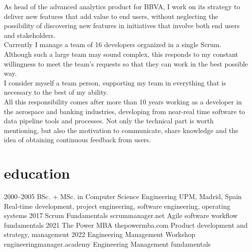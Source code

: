 \documentclass[]{friggeri-cv}
\begin{document}
As {\headingfont head of the advanced analytics product} for BBVA, I work on its strategy to deliver new features that add value to end users, without neglecting the possibility of discovering new features in initiatives that involve both end users and stakeholders. \\
Currently {\headingfont I manage a team of 16 developers} organized in a single Scrum. Although such a large team may sound complex, this responds to my constant willingness to meet the team's requests so that they can work in the best possible way. \\
{\headingfont I consider myself a team person}, supporting my team in everything that is necessary to the best of my ability. \\
{\headingfont All this responsibility comes after more than 10 years working as a developer in the aerospace and banking industries}, developing from near-real time software to data pipeline tools and processes. Not only the technical part is worth mentioning, but also the motivation to communicate, share knowledge and the idea of obtaining continuous feedback from users. \\


\section{education}

\begin{entrylist}
\entry
{2000--2005}
{BSc. + MSc. {\normalfont in Computer Science Engineering}}
{UPM, Madrid, Spain}
{Real-time development, project engineering, software engineering, operating systems}
\entry
{2017}
{{\normalfont Scrum Fundamentals}}
{scrummanager.net}
{Agile software workflow fundamentals}
\entry
{2021}
{{\normalfont The Power MBA}}
{thepowermba.com}
{Product development and strategy, management}
\entry
{2022}
{{\normalfont Engineering Management Workshop}}
{engineeringmanager.academy}
{Engineering Management fundamentals}

\end{entrylist}
\end{document}
